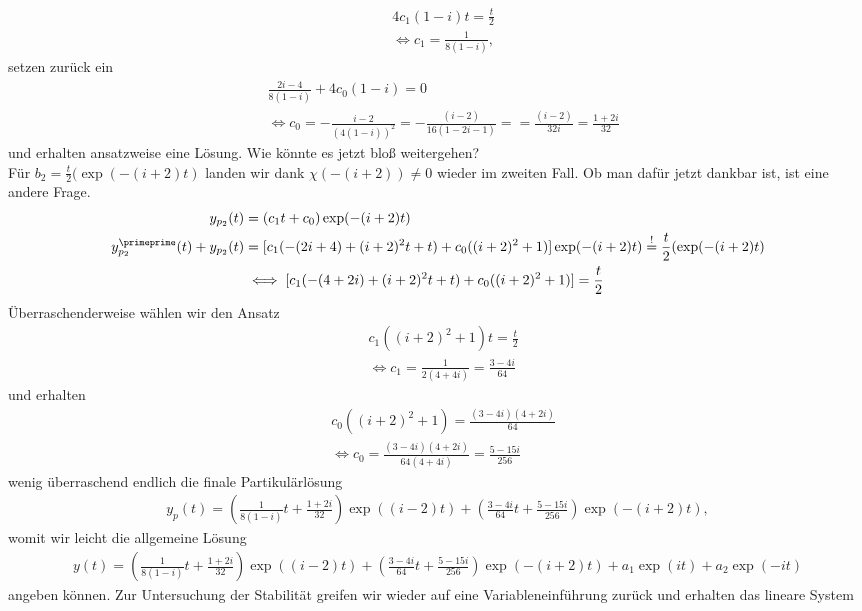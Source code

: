 \begin{solution}
\begin{enumerate}[label = \textbf{\alph*)}]
\begin{align*}
    &4c_1(1-i)t = \frac{t}{2} \\
    &\iff c_1 = \frac{1}{8(1-i)},
  \end{align*}
  setzen zurück ein
  \begin{align*}
    &\frac{2i-4}{8(1-i)} + 4c_0(1-i) = 0 \\
    &\iff c_0 = - \frac{i-2}{(4(1-i))^2} = - \frac{(i-2)}{16(1-2i-1)} =
    = \frac{(i-2)}{32i} = \frac{1 + 2i}{32}
  \end{align*}
  und erhalten ansatzweise eine Lösung.
  Wie könnte es jetzt bloß weitergehen? \\
  Für $b_2 = \frac{t}{2}(\exp(-(i+2)t)$ landen wir dank $\chi(-(i+2)) \neq 0$
  wieder im zweiten Fall. Ob man dafür jetzt dankbar ist, ist eine andere Frage.
  \begin{align*}
    y_{p_2}(t) &= (c_1t + c_0)\exp(-(i+2)t) \\
    y_{p_2}^{\primeprime}(t) + y_{p_2}(t) &=
    [c_1(-(2i+4) + (i + 2)^2t + t) + c_0((i + 2)^2 + 1)]\exp(-(i+2)t)
    \stackrel{!}{=} \frac{t}{2}(\exp(-(i+2)t) \\\
    &\iff [c_1(-(4 + 2i) + (i + 2)^2t + t) + c_0((i + 2)^2 + 1)] = \frac{t}{2}
  \end{align*}
  Überraschenderweise wählen wir den Ansatz
  \begin{align*}
    &c_1((i + 2)^2+1)t = \frac{t}{2} \\
    &\iff c_1 = \frac{1}{2(4 + 4i)} = \frac{3 - 4i}{64}
  \end{align*}
  und erhalten
  \begin{align*}
    &c_0((i + 2)^2 + 1) = \frac{(3 - 4i)(4+2i)}{64} \\
    &\iff c_0 = \frac{(3 - 4i)(4+2i)}{64(4 + 4i)} = \frac{5 - 15i}{256}
  \end{align*}
  wenig überraschend endlich die finale Partikulärlösung
  \begin{align*}
    y_p(t) = \left(\frac{1}{8(1-i)}t + \frac{1 + 2i}{32}\right)\exp((i-2)t) +
    \left(\frac{3 - 4i}{64}t + \frac{5 - 15i}{256}\right)\exp(-(i+2)t),
  \end{align*}
  womit wir leicht die allgemeine Lösung
  \begin{align*}
  y(t) = \left(\frac{1}{8(1-i)}t + \frac{1 + 2i}{32}\right)\exp((i-2)t) +
  \left(\frac{3 - 4i}{64}t + \frac{5 - 15i}{256}\right)\exp(-(i+2)t) +
  a_1\exp(it) + a_2\exp(-it)
  \end{align*}
  angeben können.
  Zur Untersuchung der Stabilität greifen wir wieder auf eine Variableneinführung
  zurück und erhalten das lineare System

\end{enumerate}
\end{solution}
